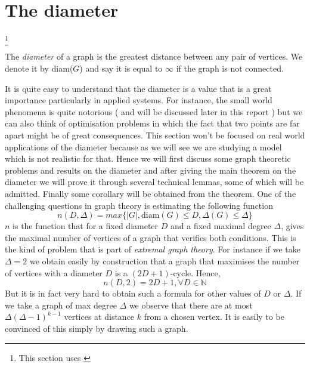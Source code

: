 \section{The diameter}\footnote{This section uses \cite{Bollob01}}

\begin{definition}
	The \emph{diameter} of a graph is the greatest distance between any pair of vertices. We denote it by diam($G$) and say it is equal to $\infty$ if the graph is not connected.
\end{definition}
It is quite easy to understand that the diameter is a value that is a great importance particularly in applied systems. For instance, the small world phenomena is quite notorious ( and will be discussed later in this report ) but we can also think of optimisation problems in which the fact that two points are far apart might be of great consequences.
This section won't be focused on real world applications of the diameter because as we will see we are studying a model which is not realistic for that. 
Hence we will first discuss some graph theoretic problems and results on the diameter and after giving the main theorem on the diameter we will prove it through several technical lemmas, some of which will be admitted. Finally some corollary will be obtained from the theorem.
\newline
One of the challenging questions in graph theory is estimating the following function
\begin{equation}\label{eq:DDeltaProb}
	n(D, \Delta) = max\{ |G|, \text{diam}(G) \leq D, \Delta(G) \leq \Delta\}
\end{equation}
$n$ is the function that for a fixed diameter $D$ and a fixed maximal degree $\Delta$, gives the maximal number of vertices of a graph that verifies both conditions. This is the kind of problem that is part of \emph{extremal graph theory}.
\newline
For instance if we take $\Delta = 2$ we obtain easily by construction that a graph that maximises the number of vertices with a diameter $D$ is a $(2D+1)$-cycle. Hence, 
\begin{equation}
	n(D, 2) = 2D + 1, \forall D \in \mathbb{N}
\end{equation}
But it is in fact very hard to obtain such a formula for other values of $D$ or $\Delta$.
\newline
If we take a graph of max degree $\Delta$ we observe that there are at most $\Delta (\Delta - 1)^{k-1}$ vertices at distance $k$ from a chosen vertex. It is easily to be convinced of this simply by drawing such a graph. 
